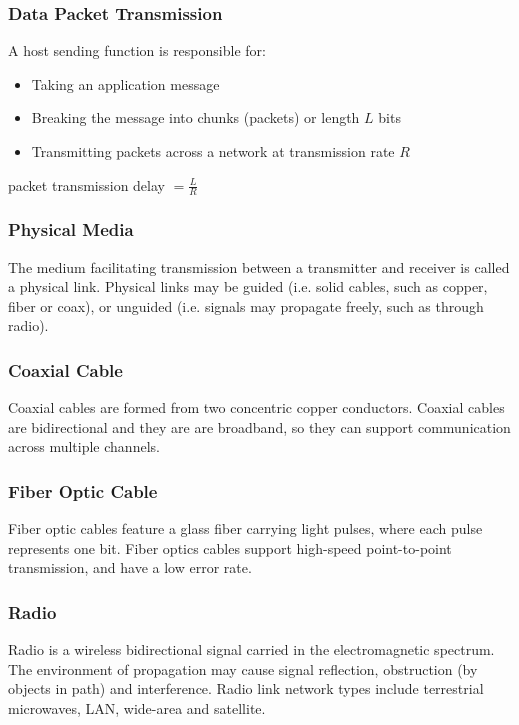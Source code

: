 \documentclass[12pt,titlepage]{article}
\begin{document}
      \subsubsection{Data Packet Transmission}
        A host sending function is responsible for:
          \begin{itemize}
            \item Taking an application message
            \item Breaking the message into chunks (packets) or length $L$ bits
            \item Transmitting packets across a network at transmission rate $R$
          \end{itemize}
      packet transmission delay $= \frac{L}{R}$

      \subsubsection{Physical Media}
        The medium facilitating transmission between a transmitter and receiver is called a physical link. Physical links may be guided
        (i.e. solid cables, such as copper, fiber or coax), or unguided (i.e. signals may propagate freely, such as through radio).

      \subsubsection{Coaxial Cable}
        Coaxial cables are formed from two concentric copper conductors. Coaxial cables are bidirectional and they are are broadband, so they
        can support communication across multiple channels.

      \subsubsection{Fiber Optic Cable}
        Fiber optic cables feature a glass fiber carrying light pulses, where each pulse represents one bit. Fiber optics cables support
        high-speed point-to-point transmission, and have a low error rate.

      \subsubsection{Radio}
        Radio is a wireless bidirectional signal carried in the electromagnetic spectrum. The environment of propagation may cause signal
        reflection, obstruction (by objects in path) and interference. Radio link network types include terrestrial microwaves, LAN, wide-area
        and satellite.
\end{document}
